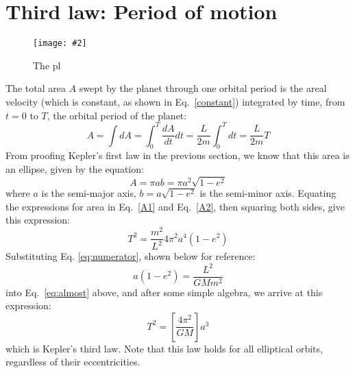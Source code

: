 \documentclass[11pt]{article}
\newcommand{\pic}[2]{
  \texttt{[image: \#2]}
}
\begin{document}
\section{Third law: Period of motion}
\begin{figure}
  \centering
  \pic{.5}{../kep8.png}
  \caption{The pl}
  \label{3rdlaw}
\end{figure}
The total area $A$ swept by the planet through one orbital period is the areal
velocity (which is constant, as shown in Eq.\ \ref{constant}) integrated by
time, from $t=0$ to $T$, the orbital period of the planet:
\begin{equation}
  A=\int dA=\int_0^T\frac{dA}{dt}dt=\frac{L}{2m}\int_0^Tdt=\frac{L}{2m}T
  \label{A1}
\end{equation}
From proofing Kepler's first law in the previous section, we know that this
area is an ellipse, given by the equation:
\begin{equation}
  A=\pi ab=\pi a^2\sqrt{1-e^2}
  \label{A2}
\end{equation}
where $a$ is the semi-major axis, $b=a\sqrt{1-e^2}$ is the semi-minor axis.
Equating the expressions for area in Eq.\ \ref{A1} and Eq.\ \ref{A2}, then
squaring both sides, give this expression:
\begin{equation}
  T^2=\frac{m^2}{L^2}4\pi^2a^4(1-e^2)
  \label{eq:almost}
\end{equation}
Substituting Eq. \ref{eq:numerator}, shown below for reference:
\begin{displaymath}
  a(1-e^2)=\frac{L^2}{GMm^2}
\end{displaymath}
into Eq.\ \ref{eq:almost} above, and after some simple algebra, we arrive at
this expression:
\begin{equation}
  \boxed{T^2=\left[\frac{4\pi^2}{GM}\right] a^3}
\end{equation}
which is Kepler's third law. Note that this law holds for all elliptical
orbits, regardless of their eccentricities.
\end{document}
